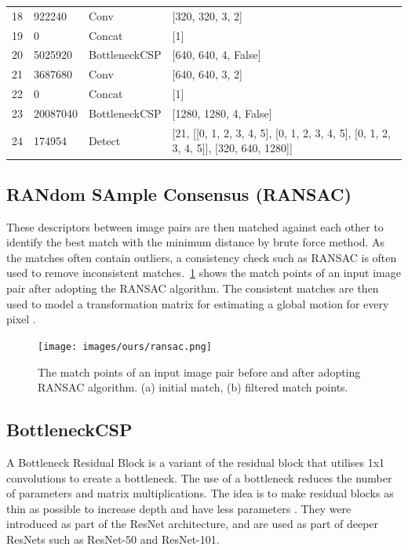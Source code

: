 \begin{table}
\begin{tabular}{p{} p{} p{} p{}}
     18 &     922240 & Conv                    &  [320, 320, 3, 2]              \\
     19 &          0 & Concat                  &  [1]                           \\
     20 &    5025920 & BottleneckCSP           &  [640, 640, 4, False]          \\
     21 &    3687680 & Conv                    &  [640, 640, 3, 2]              \\
     22 &          0 & Concat                  &  [1]                           \\
     23 &   20087040 & BottleneckCSP           &  [1280, 1280, 4, False]        \\
     24 &     174954 & Detect                  &  [21, [[0, 1, 2, 3, 4, 5], [0, 1, 2, 3, 4, 5], [0, 1, 2, 3, 4, 5]], [320, 640, 1280]] \\

\bottomrule
    \end{tabular}
  
\end{table}



\subsection{RANdom SAmple Consensus (RANSAC)}
These descriptors between image pairs are then matched against each other to identify the best match with the minimum distance by brute force method. As the matches often contain outliers, a consistency check such as RANSAC is often used to remove inconsistent matches.~\ref{fig:ransac} shows the match points of an input image pair after adopting the RANSAC algorithm. The consistent matches are then used to model a transformation matrix for estimating a global motion for every pixel \cite{10.1145/358669.358692}.

\begin{figure}[ht]
    \centering
    \texttt{[image: images/ours/ransac.png]}
   \caption[ORB and RANSAC Preview]{The match points of an input image pair before and after adopting RANSAC algorithm. (a) initial match, (b) filtered match points.}
    \label{fig:ransac}
\end{figure}


\subsection{BottleneckCSP}
A Bottleneck Residual Block is a variant of the residual block that utilises 1x1 convolutions to create a bottleneck. The use of a bottleneck reduces the number of parameters and matrix multiplications. The idea is to make residual blocks as thin as possible to increase depth and have less parameters \cite{wang2019cspnet}. They were introduced as part of the ResNet architecture, and are used as part of deeper ResNets such as ResNet-50 and ResNet-101.


